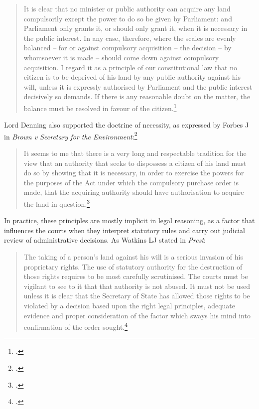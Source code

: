 \begin{quote}
It is clear that no minister or public authority can acquire any land compulsorily except the power to do so be given by Parliament: and Parliament only grants it, or should only grant it, when it is necessary in the public interest. In any case, therefore, where the scales are evenly balanced – for or against compulsory acquisition – the decision – by whomsoever it is made – should come down against compulsory acquisition. I regard it as a principle of our constitutional law that no citizen is to be deprived of his land by any public authority against his will, unless it is expressly authorised by Parliament and the public interest decisively so demands. If there is any reasonable doubt on the matter, the balance must be resolved in favour of the citizen.\footcite[198]{prest82}
\end{quote}

Lord Denning also supported the doctrine of necessity, as expressed by Forbes J in {\it Brown v Secretary for the Environment}:\footcite{brown78}

\begin{quote}It seems to me that there is a very long and respectable tradition for the view that an authority that seeks to dispossess a citizen of his land must do so by showing that it is necessary, in order to exercise the powers for the purposes of the Act under which the compulsory purchase order is made, that the acquiring authority should have authorisation to acquire the land in question.\footcite[291]{brown78}
\end{quote}

In practice, these principles are mostly implicit in legal reasoning, as a factor that influences the courts when they interpret statutory rules and carry out judicial review of administrative decisions. As Watkins LJ stated in {\it Prest}:

\begin{quote}
The taking of a person's land against his will is a serious invasion of his proprietary rights. The use of statutory authority for the destruction of those rights requires to be most carefully scrutinised. The courts must be vigilant to see to it that that authority is not abused. It must not be used unless it is clear that the Secretary of State has allowed those rights to be violated by a decision based upon the right legal principles, adequate evidence and proper consideration of the factor which sways his mind into confirmation of the order sought.\footcite[211-212]{prest82}
\end{quote}

